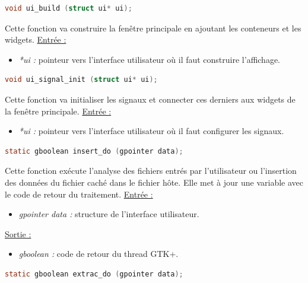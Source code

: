 \documentclass[11pt]{article}
\begin{document}
\begin{lstlisting}[language=c]
void ui_build (struct ui* ui);
\end{lstlisting}

Cette fonction va construire la fenêtre principale en ajoutant les conteneurs 
et les widgets. 
\newline
\underline{Entrée :} 
\begin{itemize}
\item \textit{*ui :} pointeur vers l'interface utilisateur où il faut construire 
l'affichage. 
\newline 
\end{itemize}

\begin{lstlisting}[language=c]
void ui_signal_init (struct ui* ui);
\end{lstlisting}

Cette fonction va initialiser les signaux et connecter ces derniers aux 
widgets de la fenêtre principale. 
\newline
\underline{Entrée :} 
\begin{itemize}
\item \textit{*ui :} pointeur vers l'interface utilisateur où il faut 
configurer les signaux. 
\newline 
\end{itemize}
 
\begin{lstlisting}[language=c]
static gboolean insert_do (gpointer data);
\end{lstlisting}

Cette fonction exécute l'analyse des fichiers entrés par l'utilisateur ou 
l'insertion des données du fichier caché dans le fichier hôte. Elle met à 
jour une variable avec le code de retour du traitement.
\newline
\underline{Entrée :} 
\begin{itemize}
\item \textit{gpointer data :} structure de l'interface utilisateur. 
\end{itemize}
\underline{Sortie :}
\begin{itemize}
\item \textit{gboolean :} code de retour du thread GTK+.
\newline 
\end{itemize}

\begin{lstlisting}[language=c]
static gboolean extrac_do (gpointer data);
\end{lstlisting}
\end{document}

